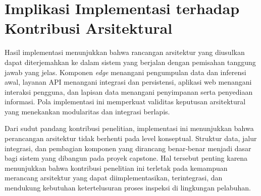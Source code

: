 \section{Implikasi Implementasi terhadap Kontribusi Arsitektural}
\label{sec:implikasi-implementasi}

Hasil implementasi menunjukkan bahwa rancangan arsitektur yang diusulkan dapat
diterjemahkan ke dalam sistem yang berjalan dengan pemisahan tanggung jawab yang
jelas. Komponen \textit{edge} menangani pengumpulan data dan inferensi awal,
layanan API menangani integrasi dan persistensi, aplikasi web menangani
interaksi pengguna, dan lapisan data menangani penyimpanan serta penyediaan
informasi. Pola implementasi ini memperkuat validitas keputusan arsitektural
yang menekankan modularitas dan integrasi berlapis.

Dari sudut pandang kontribusi penelitian, implementasi ini menunjukkan bahwa
perancangan arsitektur tidak berhenti pada level konseptual. Struktur data,
jalur integrasi, dan pembagian komponen yang dirancang benar-benar menjadi dasar
bagi sistem yang dibangun pada proyek capstone. Hal tersebut penting karena
menunjukkan bahwa kontribusi penelitian ini terletak pada kemampuan merancang
arsitektur yang dapat diimplementasikan, terintegrasi, dan mendukung kebutuhan
ketertelusuran proses inspeksi di lingkungan pelabuhan.
